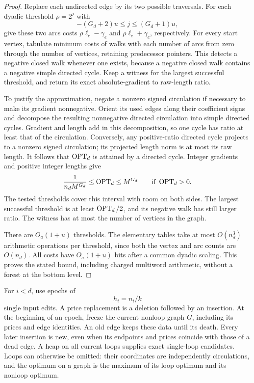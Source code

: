 \begin{proof}
Replace each undirected edge by its two possible traversals.  For each
dyadic threshold $\rho=2^j$ with
\[
              -(G_d+2)u\le j\le (G_d+1)u,
\]
give these two arcs costs $\rho\ell_e-\gamma_e$ and
$\rho\ell_e+\gamma_e$, respectively.  For every start vertex, tabulate
minimum costs of walks with each number of arcs from zero through the
number of vertices, retaining predecessor pointers.  This detects a
negative closed walk whenever one exists, because a negative closed walk
contains a negative simple directed cycle.  Keep a witness for the largest
successful threshold, and return its exact absolute-gradient to raw-length
ratio.

To justify the approximation, negate a nonzero signed circulation if
necessary to make its gradient nonnegative.  Orient its used edges along
their coefficient signs and decompose the resulting nonnegative directed
circulation into simple directed cycles.  Gradient and length add in this
decomposition, so one cycle has ratio at least that of the circulation.
Conversely, any positive-ratio directed cycle projects to a nonzero signed
circulation; its projected length norm is at most its raw length.  It
follows that $\operatorname{OPT}_d$ is attained by a directed cycle.  Integer gradients
and positive integer lengths give
\[
        \frac{1}{n_d M^{G_d}}\le\operatorname{OPT}_d\le M^{G_d}
                  \qquad\text{if }\operatorname{OPT}_d>0.
\]
The tested thresholds cover this interval with room on both sides.  The
largest successful threshold is at least $\operatorname{OPT}_d/2$, and its negative
walk has still larger ratio.  The witness has at most the number of
vertices in the graph.

There are $O_a(1+u)$ thresholds.  The elementary tables take at most
$O(n_d^3)$ arithmetic operations per threshold, since both the vertex
and arc counts are $O(n_d)$.  All costs have $O_a(1+u)$ bits after a
common dyadic scaling.  This proves the stated bound, including charged
multiword arithmetic, without a forest at the bottom level.
\end{proof}

For $i<d$, use epochs of
\begin{equation}
\label{back:epoch}
                         h_i=n_i/k
\end{equation}
single input edits.  A price replacement is a deletion followed by an
insertion.  At the beginning of an epoch, freeze the current nonloop
graph $\bar G$, including its prices and edge identities.  An old edge
keeps these data until its death.  Every later insertion is new, even
when its endpoints and prices coincide with those of a dead edge.
A heap on all current loops supplies exact single-loop candidates.
Loops can otherwise be omitted: their coordinates are independently
circulations, and the optimum on a graph is the maximum of its loop
optimum and its nonloop optimum.

